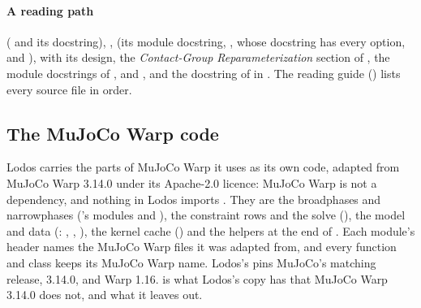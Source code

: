 \endgroup

\paragraph{A reading path}  ( and its docstring), ,  (its module docstring, , whose docstring has every option, and ),  with its design, the \emph{Contact-Group Reparameterization} section of , the module docstrings of ,  and , and the docstring of  in . The reading guide () lists every source file in order.

\subsection{The MuJoCo Warp code}\label{sec:mjwarp}

Lodos carries the parts of MuJoCo Warp it uses as its own code, adapted from MuJoCo Warp 3.14.0 under its Apache-2.0 licence: MuJoCo Warp is not a dependency, and nothing in Lodos imports . They are the broadphases and narrowphases ('s  modules and ), the constraint rows and the solve (), the model and data (: , , ), the kernel cache () and the helpers at the end of . Each module's header names the MuJoCo Warp files it was adapted from, and every function and class keeps its MuJoCo Warp name. Lodos's  pins MuJoCo's matching release, 3.14.0, and Warp 1.16.  is what Lodos's copy has that MuJoCo Warp 3.14.0 does not, and what it leaves out.

